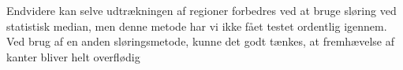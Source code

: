 {Endvidere kan selve udtrækningen af regioner forbedres ved at bruge
sløring ved statistisk median, men denne metode har vi ikke fået testet
ordentlig igennem. Ved brug af en anden sløringsmetode, kunne det godt
tænkes, at fremhævelse af kanter bliver helt overflødig

}

